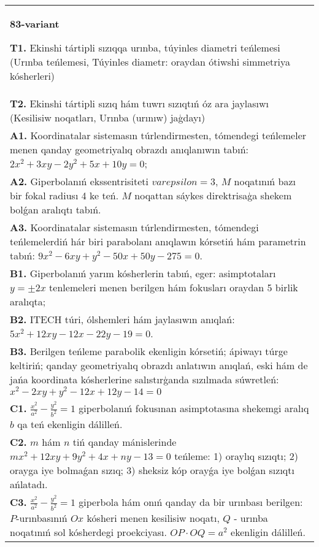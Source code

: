 \documentclass{article}
\begin{document}
\begin{tabular}{m{17cm}}
\textbf{83-variant}
\newline

\textbf{T1.} Ekinshi tártipli sızıqqa urınba, túyinles diametri teńlemesi (Urınba teńlemesi, Túyinles diametr: oraydan ótiwshi simmetriya kósherleri) \\
\textbf{T2.} Ekinshi tártipli sızıq hám tuwrı sızıqtıń óz ara jaylasıwı (Kesilisiw noqatları, Urınba (urınıw) jaģdayı) \\
\textbf{A1.} Koordinatalar sistemasın túrlendirmesten, tómendegi teńlemeler menen qanday geometriyalıq obrazdı anıqlanıwın tabıń: $2 x^2+3 x y-2 y^2+5 x+10 y=0$; \\
\textbf{A2.} Giperbolanıń ekssentrisiteti $varepsilon=3$, $M$ noqatınıń bazı bir fokal radiusı 4 ke teń. $M$ noqattan sáykes direktrisaģa shekem bolǵan aralıqtı tabıń. \\
\textbf{A3.} Koordinatalar sistemasın túrlendirmesten, tómendegi teńlemelerdiń hár biri parabolanı anıqlawın kórsetiń hám parametrin tabıń: $9 x^2-6 x y+y^2-50 x+50 y-275=0$. \\
\textbf{B1.} Giperbolanıń yarım kósherlerin tabıń, eger: asimptotaları $y= \pm 2 x$ tenlemeleri menen berilgen hám fokusları oraydan 5 birlik aralıqta; \\
\textbf{B2.} ITECH túri, ólshemleri hám jaylasıwın anıqlań: $5 x^2+12 x y-12 x-22 y-19=0$. \\
\textbf{B3.} Berilgen teńleme parabolik ekenligin kórsetiń; ápiwayı túrge keltiriń; qanday geometriyalıq obrazdı anlatıwın anıqlań, eski hám de jańa koordinata kósherlerine salıstırģanda sızılmada súwretleń: $x^2-2 x y+y^2-12 x+12 y-14=0$ \\
\textbf{C1.} $\frac{x^2}{a^2}-\frac{y^2}{b^2}=1$ giperbolanıń fokusınan asimptotasına shekemgi aralıq $b$ qa teń ekenligin dálilleń. \\
\textbf{C2.} $m$ hám $n$ tiń qanday mánislerinde $m x^2+12 x y+9 y^2+4 x+n y-13=0$ teńleme: 1) oraylıq sızıqtı; 2) orayga iye bolmaǵan sızıq; 3) sheksiz kóp orayǵa iye bolǵan sızıqtı ańlatadı. \\
\textbf{C3.} $\frac{x^2}{a^2}-\frac{y^2}{b^2}=1$ giperbola hám onıń qanday da bir urınbası berilgen: $P$-urınbasınıń $O x$ kósheri menen kesilisiw noqatı, $Q$ - urınba noqatınıń sol kósherdegi proekciyası. $O P \cdot O Q=a^2$ ekenligin dálilleń. \\

\end{tabular}
\vspace{1cm}
\end{document}
